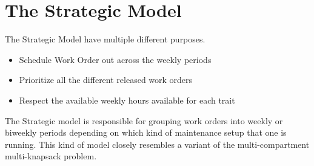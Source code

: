 \section{The Strategic Model}


The Strategic Model have multiple different purposes.
\begin{itemize}
	\item Schedule Work Order out across the weekly periods
	\item Prioritize all the different released work orders
	\item Respect the available weekly hours available for each trait
\end{itemize}

The Strategic model is responsible for grouping work orders into weekly or biweekly periods depending on which kind of maintenance setup that one is running.
This kind of model closely resembles a variant of the multi-compartment multi-knapsack problem. 


